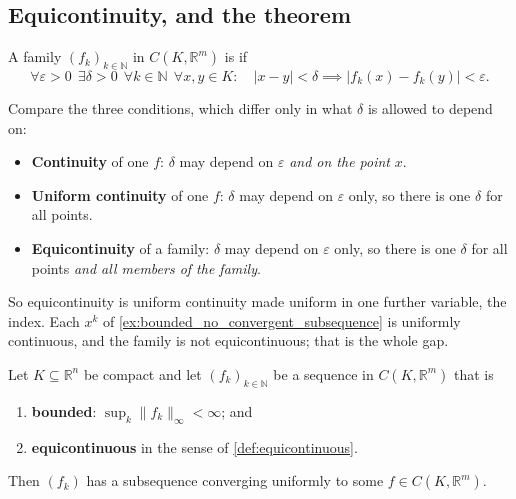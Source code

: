 \subsection{Equicontinuity, and the theorem}

\begin{definition}[Equicontinuity]
\label{def:equicontinuous}
A family $(f_k)_{k\in\mathbb{N}}$ in $C(K,\mathbb{R}^m)$ is 
 if
\[\forall \varepsilon>0\ \ \exists \delta>0\ \ \forall k \in \mathbb{N}\ \ \forall x,y \in K :
  \quad \lvert x-y\rvert < \delta \implies \lvert f_k(x)-f_k(y)\rvert < \varepsilon.\]
\end{definition}

\begin{remark}
\label{rem:equicontinuity_quantifiers}
Compare the three conditions, which differ only in what $\delta$ is allowed to depend on:
\begin{itemize}
  \item \textbf{Continuity} of one $f$: $\delta$ may depend on $\varepsilon$ \emph{and on the
    point} $x$.
  \item \textbf{Uniform continuity} of one $f$: $\delta$ may depend on $\varepsilon$ only, so
    there is one $\delta$ for all points.
  \item \textbf{Equicontinuity} of a family: $\delta$ may depend on $\varepsilon$ only, so there
    is one $\delta$ for all points \emph{and all members of the family}.
\end{itemize}
So equicontinuity is uniform continuity made uniform in one further variable, the index. Each
$x^k$ of \cref{ex:bounded_no_convergent_subsequence} is uniformly continuous, and the family is
not equicontinuous; that is the whole gap.
\end{remark}

\begin{theorem}
\label{thm:ascoli_arzela}
Let $K \subseteq \mathbb{R}^n$ be compact and let $(f_k)_{k\in\mathbb{N}}$ be a sequence in
$C(K,\mathbb{R}^m)$ that is
\begin{enumerate}[label=\textbf{(\alph*)}]
  \item \textbf{bounded}: $\sup_k \lVert f_k\rVert_\infty < \infty$; and
  \item \textbf{equicontinuous} in the sense of \cref{def:equicontinuous}.
\end{enumerate}
Then $(f_k)$ has a subsequence converging uniformly to some $f \in C(K,\mathbb{R}^m)$.
\end{theorem}


